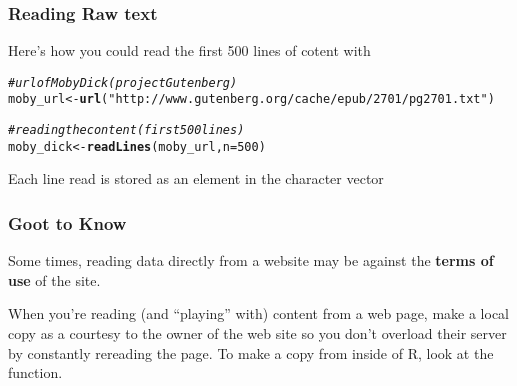\documentclass[12pt]{beamer}\usepackage[]{graphicx}\usepackage[]{color}
\makeatletter
\newcommand{\hlnum}[1]{\textcolor[rgb]{0.686,0.059,0.569}{#1}}%
\newcommand{\hlstr}[1]{\textcolor[rgb]{0.192,0.494,0.8}{#1}}%
\newcommand{\hlcom}[1]{\textcolor[rgb]{0.678,0.584,0.686}{\textit{#1}}}%
\newcommand{\hlstd}[1]{\textcolor[rgb]{0.345,0.345,0.345}{#1}}%
\newcommand{\hlkwb}[1]{\textcolor[rgb]{0.69,0.353,0.396}{#1}}%
\newcommand{\hlkwc}[1]{\textcolor[rgb]{0.333,0.667,0.333}{#1}}%
\newcommand{\hlkwd}[1]{\textcolor[rgb]{0.737,0.353,0.396}{\textbf{#1}}}%
\newenvironment{kframe}{%
 \def\at@end@of@kframe{}%
 \ifinner\ifhmode%
  \def\at@end@of@kframe{\end{minipage}}%
  \begin{minipage}{\columnwidth}%
 \fi\fi%
 \def\FrameCommand##1{\hskip\@totalleftmargin \hskip-\fboxsep
 \colorbox{shadecolor}{##1}\hskip-\fboxsep
     \hskip-\linewidth \hskip-\@totalleftmargin \hskip\columnwidth}%
 \MakeFramed {\advance\hsize-\width
   \@totalleftmargin\z@ \linewidth\hsize
   \@setminipage}}%
 {\par\unskip\endMakeFramed%
 \at@end@of@kframe}
\newenvironment{knitrout}{}{} %
\makeatother
\begin{document}
\begin{frame}[fragile]
\frametitle{Reading Raw text}

Here's how you could read the first 500 lines of cotent with {\hilit {}}

\begin{knitrout}\scriptsize
{}\color{fgcolor}\begin{kframe}
\begin{alltt}
\hlcom{# url of Moby Dick (project Gutenberg)}
\hlstd{moby_url} \hlkwb{<-} \hlkwd{url}\hlstd{(}\hlstr{"http://www.gutenberg.org/cache/epub/2701/pg2701.txt"}\hlstd{)}

\hlcom{# reading the content (first 500 lines)}
\hlstd{moby_dick} \hlkwb{<-} \hlkwd{readLines}\hlstd{(moby_url,} \hlkwc{n} \hlstd{=} \hlnum{500}\hlstd{)}
\end{alltt}
\end{kframe}
\end{knitrout}

{\footnotesize Each line read is stored as an element in the character vector }

\end{frame}


\begin{frame}[fragile]
\frametitle{Goot to Know}

Some times, reading data directly from a website may be against the \textbf{terms of use} of the site.
\eb

When you're reading (and ``playing'' with) content from a web page, make a local copy as a courtesy to the owner of the web site so you don't overload their server by constantly rereading the page. To make a copy from inside of R, look at the {\hilit {}} function. 
\eb

\end{frame}

\end{document}

